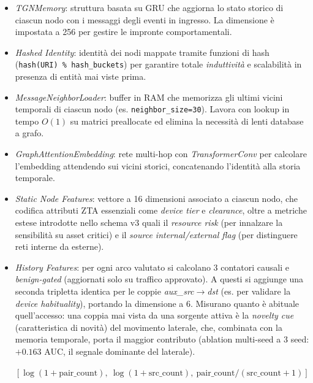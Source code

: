 \begin{itemize}
    \item \textit{TGNMemory}: struttura basata su GRU che aggiorna lo stato storico di ciascun nodo con i messaggi degli eventi in ingresso. La dimensione è impostata a 256 per gestire le impronte comportamentali.
    
    \item \textit{Hashed Identity}: identità dei nodi mappate tramite funzioni di hash (\texttt{hash(URI) \% hash\_buckets}) per garantire totale \textit{induttività} e scalabilità in presenza di entità mai viste prima.
    
    \item \textit{MessageNeighborLoader}: buffer in RAM che memorizza gli ultimi vicini temporali di ciascun nodo (es. \texttt{neighbor\_size=30}). Lavora con lookup in tempo $O(1)$ su matrici preallocate ed elimina la necessità di lenti database a grafo.
    
    \item \textit{GraphAttentionEmbedding}: rete multi-hop con \textit{TransformerConv} per calcolare l'embedding attendendo sui vicini storici, concatenando l'identità alla storia temporale.
    
    \item \textit{Static Node Features}: vettore a 16 dimensioni associato a ciascun nodo, che codifica attributi ZTA essenziali come \textit{device tier} e \textit{clearance}, oltre a metriche estese introdotte nello schema v3 quali il \textit{resource risk} (per innalzare la sensibilità su asset critici) e il \textit{source internal/external flag} (per distinguere reti interne da esterne).
    
    \item \textit{History Features}: per ogni arco valutato si calcolano 3 contatori causali e \textit{benign-gated} (aggiornati solo su traffico approvato). A questi si aggiunge una seconda tripletta identica per le coppie \textit{aux\_src}$\rightarrow$\textit{dst} (es. per validare la \textit{device habituality}), portando la dimensione a 6. Misurano quanto è abituale quell'accesso: una coppia mai vista da una sorgente attiva è la \textit{novelty cue} (caratteristica di novità) del movimento laterale, che, combinata con la memoria temporale, porta il maggior contributo (ablation multi-seed a 3 seed: $+0.163$ AUC, il segnale dominante del laterale).
    \begin{center}
        \texttt{$[\log(1{+}\text{pair\_count}),\ \log(1{+}\text{src\_count}),\ \text{pair\_count}/(\text{src\_count}{+}1)]$}
    \end{center}
    

\end{itemize}
